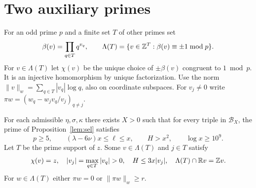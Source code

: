 \section{Two auxiliary primes}\label{sec:pair}
For an odd prime $p$ and a finite set $T$ of other primes set
\[
 \beta(v)=\prod_{q\in T}q^{v_q},\qquad
 \Lambda(T)=\{v\in\mathbb Z^T:\beta(v)\equiv\pm1\bmod p\}.
\]
For $v\in\Lambda(T)$ let $\chi(v)$ be the unique choice of
$\pm\beta(v)$ congruent to $1\bmod p$. It is an injective homomorphism
by unique factorization. Use the norm $\|v\|_w=\sum_{q\in T}|v_q|\log q$,
also on coordinate subspaces. For $v_j\ne0$ write
$\pi w=(w_q-w_jv_q/v_j)_{q\ne j}$.

\begin{proposition}\label{lem:separate}
For each admissible $\eta,\sigma,\kappa$ there exists $X>0$ such that
for every triple in $\mathcal B_X$, the prime of Proposition~\ref{lem:sel} satisfies
\[
 p\ge5,\qquad (\lambda-6\nu)x\le\ell\le x,\qquad H>x^2,\qquad \log x\ge10^9.
\]
Let $T$ be the prime support of $z$. Some $v\in\Lambda(T)$ and
$j\in T$ satisfy
\[
 \chi(v)=z,\quad |v_j|=\max_{q\in T}|v_q|>0,\quad H\le3x|v_j|,
 \quad \Lambda(T)\cap\R v=\Z v.
\]
For $w\in\Lambda(T)$ either $\pi w=0$ or $\|\pi w\|_w\ge r$.
\end{proposition}
